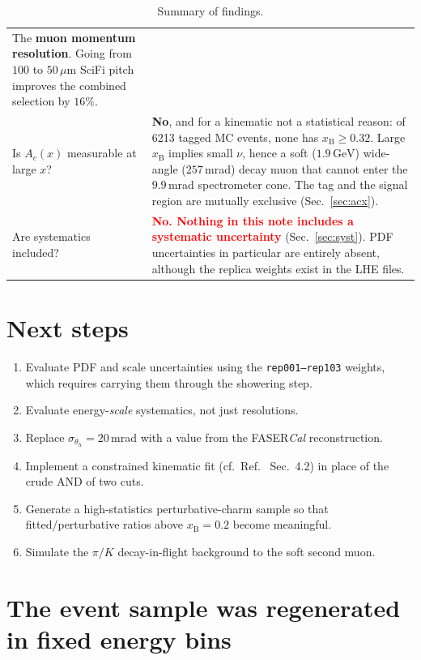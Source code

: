 \documentclass[11pt,a4paper]{article}
\newcommand{\xB}{x_{\mathrm{B}}}
\newcommand{\thh}{\theta_{h}}
\newcommand{\GeV}{\,\mathrm{GeV}}
\newcommand{\note}[1]{\textcolor{red}{\textbf{#1}}}
\begin{document}
\begin{table}[htbp]
\begin{tabular}{p{6.3cm}p{8.6cm}}
The \textbf{muon momentum resolution}. Going from $100$ to $50\,\mu$m SciFi
pitch improves the combined selection by $16\%$. \\[3pt]
Is $A_c(x)$ measurable at large $x$? &
\textbf{No}, and for a kinematic not a statistical reason: of 6213 tagged MC
events, none has $\xB\geq0.32$. Large $\xB$ implies small $\nu$, hence a soft
($1.9\GeV$) wide-angle ($257\,$mrad) decay muon that cannot enter the $9.9\,$mrad
spectrometer cone. The tag and the signal region are mutually exclusive
(Sec.~\ref{sec:acx}). \\[3pt]
Are systematics included? &
\note{No. Nothing in this note includes a systematic uncertainty}
(Sec.~\ref{sec:syst}). PDF uncertainties in particular are entirely absent,
although the replica weights exist in the LHE files. \\
\bottomrule
\end{tabular}
\caption{Summary of findings.}
\end{table}

\section*{Next steps}
\begin{enumerate}
  \item Evaluate PDF and scale uncertainties using the \texttt{rep001--rep103}
        weights, which requires carrying them through the showering step.
  \item Evaluate energy-\emph{scale} systematics, not just resolutions.
  \item Replace $\sigma_{\thh}=20\,$mrad with a value from the FASER\emph{Cal}
        reconstruction.
  \item Implement a constrained kinematic fit (cf.\ Ref.~\cite{francener}
        Sec.~4.2) in place of the crude AND of two cuts.
  \item Generate a high-statistics perturbative-charm sample so that
        fitted/perturbative ratios above $\xB=0.2$ become meaningful.
  \item Simulate the $\pi/K$ decay-in-flight background to the soft second muon.
\end{enumerate}

\appendix

\section{The event sample was regenerated in fixed energy bins}
\label{app:binned}
\end{document}
